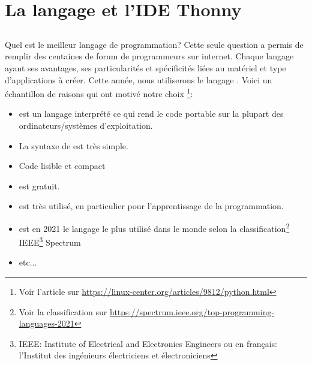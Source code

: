 \section{La langage \py et l'IDE Thonny}
\subsection{\py}
Quel est le meilleur langage de programmation? Cette seule question a permis de remplir des centaines de forum de programmeurs sur internet. Chaque langage ayant ses avantages, ses particularités et spécificités liées au matériel et type d'applications à créer. Cette année, nous utiliserons le langage \py. Voici un échantillon de raisons qui ont motivé notre choix \footnote{Voir l'article sur  \url{https://linux-center.org/articles/9812/python.html}}:
\begin{itemize}
	\item \py est un langage interprété ce qui rend le code portable sur la plupart des ordinateurs/systèmes d'exploitation.
	\item La syntaxe de \py est très simple. 
	\item Code lisible et compact
	\item \py est gratuit.
	\item \py est très utilisé, en particulier pour l'apprentissage de la programmation.
	\item \py est en 2021 le langage le plus utilisé dans le monde selon la classification\footnote{Voir la classification sur \url{https://spectrum.ieee.org/top-programming-languages-2021}} IEEE\footnote{IEEE: Institute of Electrical and Electronics Engineers ou en français: l'Institut des ingénieurs électriciens et électroniciens} Spectrum 
	\item etc...
\end{itemize}

